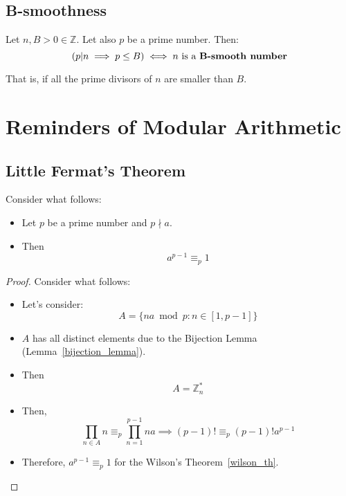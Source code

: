 \subsection{B-smoothness}
\begin{definition}[B-smoothness]
    Let $n, B > 0 \in \mathbb{Z}$. Let also $p$ be a prime number. Then:
    \[(p|n \implies p \leq B) \iff n \text{ is a \textbf{B-smooth number}}\]
\end{definition}
That is, if all the prime divisors of $n$ are smaller than $B$.

\section{Reminders of Modular Arithmetic}
\subsection{Little Fermat's Theorem}\label{little_fermat_th}
\begin{theorem}
    Consider what follows:
    \begin{itemize}
        \item Let $p$ be a prime number and $p \nmid a$.
        \item Then \[a^{p-1} \equiv_{p} 1\]
    \end{itemize}
\end{theorem}
\begin{proof}
    Consider what follows:
    \begin{itemize}
        \item Let's consider: \[A = \{na \bmod p: n \in [1, p-1]\}\]
        \item $A$ has all distinct elements due to the Bijection Lemma (Lemma~\ref{bijection_lemma}).
        \item Then \[A = \mathbb{Z}_{n}^{*}\]
        \item Then, \[\prod\limits_{n \in A} n \equiv_{p} \prod\limits_{n=1}^{p-1} na \implies (p-1)! \equiv_{p} (p-1)!a^{p-1}\]
        \item Therefore, $a^{p-1} \equiv_{p} 1$ for the Wilson's Theorem~\ref{wilson_th}.
    \end{itemize}
\end{proof}

